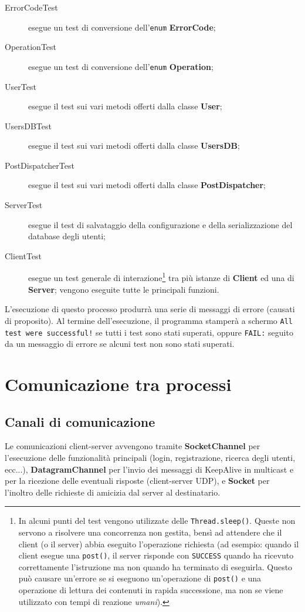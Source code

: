 \documentclass[11pt]{article}
\begin{document}
\begin{description}
	\item[ErrorCodeTest] esegue un test di conversione dell'{\tt enum}
	{\bf ErrorCode};
	\item[OperationTest] esegue un test di conversione dell'{\tt enum}
	{\bf Operation};
	\item[UserTest] esegue il test sui vari metodi offerti dalla classe
	{\bf User};
	\item[UsersDBTest] esegue il test sui vari metodi offerti dalla classe
	{\bf UsersDB};
	\item[PostDispatcherTest] esegue il test sui vari metodi offerti dalla classe
	{\bf PostDispatcher};
	\item[ServerTest] esegue il test di salvataggio della configurazione e della
	serializzazione del database degli utenti;
	\item[ClientTest] esegue un test generale di interazione\footnote{In alcuni
	punti del test vengono utilizzate delle {\tt Thread.sleep()}. Queste non
	servono a risolvere una concorrenza non gestita, bensì ad attendere che il
	client (o il server) abbia eseguito l'operazione richiesta (ad esempio:
	quando il client esegue una {\tt post()}, il server risponde con
	{\tt SUCCESS} quando ha ricevuto correttamente l'istruzione ma non quando
	ha terminato di eseguirla. Questo può causare un'errore se si eseguono
	un'operazione di {\tt post()} e una operazione di lettura dei contenuti in
	rapida successione, ma non se viene utilizzato con tempi di reazione
	\emph{umani}).} tra più istanze di {\bf Client} ed una di {\bf Server};
	vengono eseguite tutte le principali funzioni.
\end{description}

L'esecuzione di questo processo produrrà una serie di messaggi di errore
(causati di proposito). Al termine dell'esecuzione, il programma stamperà a
schermo {\tt All test were successful!} se tutti i test sono stati superati,
oppure {\tt FAIL:} seguito da un messaggio di errore se alcuni test non sono
stati superati.

\section{Comunicazione tra processi}

\subsection{Canali di comunicazione}
Le comunicazioni client-server avvengono tramite {\bf SocketChannel} per
l'esecuzione delle funzionalità principali (login, registrazione, ricerca degli
utenti, ecc...), {\bf DatagramChannel} per l'invio dei messaggi di KeepAlive in
multicast e per la ricezione delle eventuali risposte (client-server UDP), e
{\bf Socket} per l'inoltro delle richieste di amicizia dal server al
destinatario.
\end{document}
